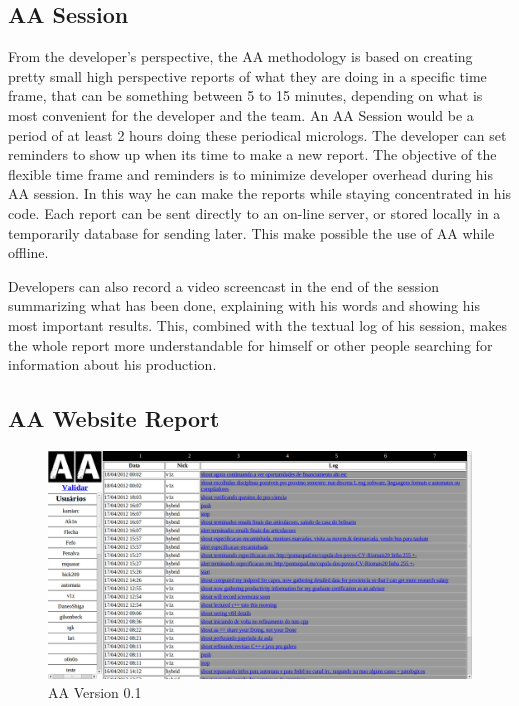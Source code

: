 \documentclass[letterpaper]{article}
\begin{document}
\subsection{AA Session}

From the developer's perspective, the AA methodology is based on
creating pretty small high perspective reports of what they are doing
in a specific time frame, that can be something between 5 to 15
minutes, depending on what is most convenient for the developer and the team. An
AA Session would be a period of at least 2 hours doing these periodical
micrologs. The developer can set reminders to show up when its time to
make a new report. The objective of the flexible time frame and
reminders is to minimize developer overhead during his AA session. In
this way he can make the reports while staying concentrated in his
code. Each report can be sent directly to an on-line server, or stored
locally in a temporarily database for sending later. This make
possible the use of AA while offline.

Developers can also record a video screencast in the end of the
session summarizing what has been done, explaining with his words and
showing his most important results. This, combined with the textual
log of his session, makes the whole report more understandable for
himself or other people searching for information about his
production.

\subsection{AA Website Report}

\begin{figure}
\begin{center}
   \includegraphics[width=0.95\linewidth]{figs/aa-0_1.png}
\end{center}
   \caption{AA Version 0.1}
\label{fig:aaserver}
\end{figure}
\end{document}

